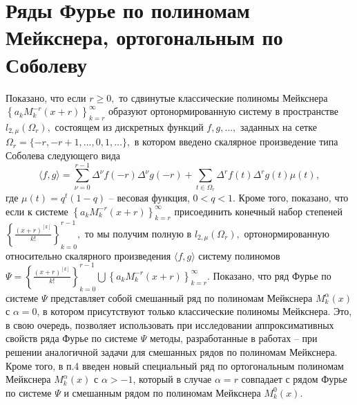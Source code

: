 \section{Ряды Фурье по полиномам Мейкснера, ортогональным по Соболеву}
Показано, что если $r\geq 0,$  то сдвинутые классические полиномы Мейкснера \linebreak $\left\{a_kM_k^{-r}(x+r)\right\}_{k=r}^\infty$ образуют ортонормированную систему в пространстве $l_{2,\mu}(\Omega_r),$  состоящем из дискретных функций $f,g, \ldots,$  заданных на сетке $\Omega_r=\{-r, -r+1, \ldots, 0, 1, \ldots\},$  в котором введено  скалярное произведение типа Соболева следующего вида
$$
\langle f,g \rangle=\sum_{\nu=0}^{r-1}\Delta^{\nu} f(-r)\Delta^{\nu} g(-r) + \sum_{t\in\Omega_r}\Delta^r f(t) \Delta^r g(t)\mu(t),
$$
где  $\mu(t)=q^t(1-q)$ -- весовая функция, $0<q<1.$  Кроме того, показано, что если к системе $\left\{a_kM_k^{-r}(x+r)\right\}_{k=r}^\infty$  присоединить конечный набор степеней $\left\{\frac{(x+r)^{[k]}}{k!}\right\}_{k=0}^{r-1},$ то мы получим полную в $l_{2,\mu}(\Omega_r),$  ортонормированную относительно скалярного произведения $\langle f,g \rangle$ систему полиномов $\Psi=\left\{\frac{(x+r)^{[k]}}{k!}\right\}_{k=0}^{r-1}\bigcup\left\{a_kM_k^{-r}(x+r)\right\}_{k=r}^\infty.$
Показано, что ряд Фурье по системе  $\Psi$ представляет собой смешанный ряд по полиномам Мейкснера $M_k^\alpha(x)$ с $\alpha=0$, в котором присутствуют только классические полиномы Мейкснера. Это, в свою очередь, позволяет использовать при исследовании аппроксимативных свойств ряда Фурье по системе $\Psi$  методы, разработанные в работах \cite{Ram14} -- \cite{meixner-11} при решении аналогичной задачи для смешанных рядов по полиномам Мейкснера. Кроме того, в п.4 введен новый специальный ряд по ортогональным полиномам Мейкснера $M_k^{\alpha}(x)$ с $\alpha>-1$, который в случае $\alpha=r$  совпадает с рядом Фурье по системе $\Psi$  и смешанным рядом по полиномам Мейкснера $M_k^0(x)$.


%
%


